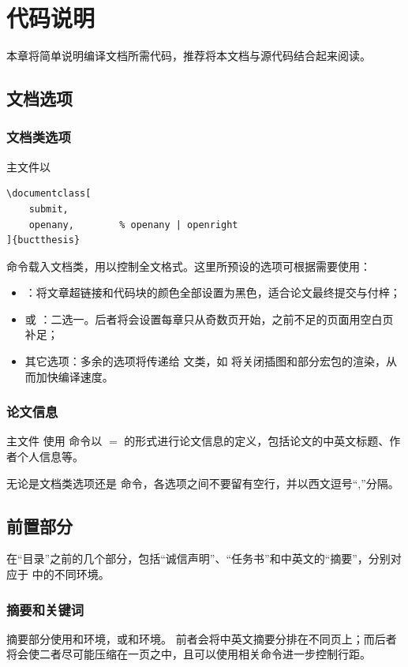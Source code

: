 \chapter{代码说明}\label{chap:CodeIntro}
本章将简单说明编译文档所需代码，推荐将本文档与源代码结合起来阅读。

\section{文档选项}\label{sec:options}
\subsection{文档类选项}
主文件以
\begin{lstlisting}
\documentclass[
	submit,
	openany,		% openany | openright
]{buctthesis}
\end{lstlisting}
命令载入文档类，用以控制全文格式。这里所预设的选项可根据需要使用：
\begin{itemize}
	\item {}：将文章超链接和代码块的颜色全部设置为黑色，适合论文最终提交与付梓；
	\item {} 或 ：二选一。后者将会设置每章只从奇数页开始，之前不足的页面用空白页补足；
	\item 其它选项：多余的选项将传递给  文类，如  将关闭插图和部分宏包的渲染，从而加快编译速度。
\end{itemize}
\subsection{论文信息}\label{subsec:buctsetup}
主文件  使用  命令以 $=$ 的形式进行论文信息的定义，包括论文的中英文标题、作者个人信息等。

无论是文档类选项还是  命令，各选项之间不要留有空行，并以西文逗号“,”分隔。

\section{前置部分}\label{sec:frontmatter}
在“目录”之前的几个部分，包括“诚信声明”、“任务书”和中英文的“摘要”，分别对应于  中的不同环境。

\subsection{摘要和关键词}\label{subsec:abstract}
摘要部分使用和环境，或和环境。
前者会将中英文摘要分排在不同页上；而后者将会使二者尽可能压缩在一页之中，且可以使用相关命令进一步控制行距。

